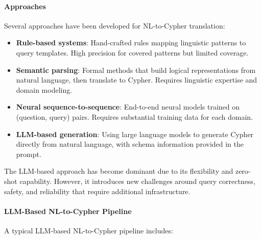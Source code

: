 \documentclass[a4paper,twoside]{sapthesis}
\begin{document}
\paragraph{Approaches}

Several approaches have been developed for NL-to-Cypher translation:

\begin{itemize}
    \item \textbf{Rule-based systems}: Hand-crafted rules mapping linguistic patterns to query templates. High precision for covered patterns but limited coverage.
    
    \item \textbf{Semantic parsing}: Formal methods that build logical representations from natural language, then translate to Cypher. Requires linguistic expertise and domain modeling.
    
    \item \textbf{Neural sequence-to-sequence}: End-to-end neural models trained on (question, query) pairs. Requires substantial training data for each domain.
    
    \item \textbf{LLM-based generation}: Using large language models to generate Cypher directly from natural language, with schema information provided in the prompt.
\end{itemize}

The LLM-based approach has become dominant due to its flexibility and zero-shot capability. However, it introduces new challenges around query correctness, safety, and reliability that require additional infrastructure.

\paragraph{LLM-Based NL-to-Cypher Pipeline}

A typical LLM-based NL-to-Cypher pipeline includes:
\end{document}
